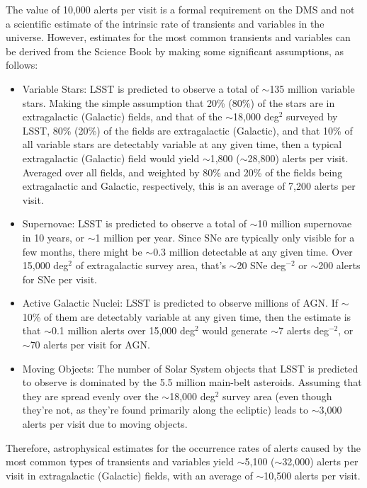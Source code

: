 \documentclass[DM,lsstdraft,authoryear,toc]{lsstdoc}
\begin{document}
The value of 10,000 alerts per visit is a formal requirement on the DMS and not a scientific estimate of the intrinsic rate of transients and variables in the universe. However, estimates for the most common transients and variables can be derived from the Science Book \citep{2009arXiv0912.0201L} by making some significant assumptions, as follows:
\begin{itemize}
\item Variable Stars: LSST is predicted to observe a total of $\sim$135 million variable stars. Making the simple assumption that 20\% (80\%) of the stars are in extragalactic (Galactic) fields, and that of the $\sim$18,000 deg$^2$ surveyed by LSST, 80\% (20\%) of the fields are extragalactic (Galactic), and that 10\% of all variable stars are detectably variable at any given time, then a typical extragalactic (Galactic) field would yield $\sim$1,800 ($\sim$28,800) alerts per visit. Averaged over all fields, and weighted by 80\% and 20\% of the fields being extragalactic and Galactic, respectively, this is an average of 7,200 alerts per visit.
\item Supernovae: LSST is predicted to observe a total of $\sim$10 million supernovae in 10 years, or $\sim$1 million per year. Since SNe are typically only visible for a few months, there might be $\sim$0.3 million detectable at any given time. Over 15,000 deg$^{2}$ of extragalactic survey area, that's $\sim$20 SNe deg$^{-2}$ or $\sim$200 alerts for SNe per visit.
\item Active Galactic Nuclei: LSST is predicted to observe millions of AGN. If $\sim$10\% of them are detectably variable at any given time, then the estimate is that $\sim$0.1 million alerts over 15,000 deg$^2$ would generate $\sim$7 alerts deg$^{-2}$, or $\sim$70 alerts per visit for AGN.
\item Moving Objects: The number of Solar System objects that LSST is predicted to observe is dominated by the 5.5 million main-belt asteroids. Assuming that they are spread evenly over the $\sim$18,000 deg$^2$ survey area (even though they're not, as they're found primarily along the ecliptic) leads to $\sim$3,000 alerts per visit due to moving objects.
\end{itemize} 
Therefore, astrophysical estimates for the occurrence rates of alerts caused by the most common types of transients and variables yield $\sim$5,100 ($\sim$32,000) alerts per visit in extragalactic (Galactic) fields, with an average of $\sim$10,500 alerts per visit.


\end{document}
